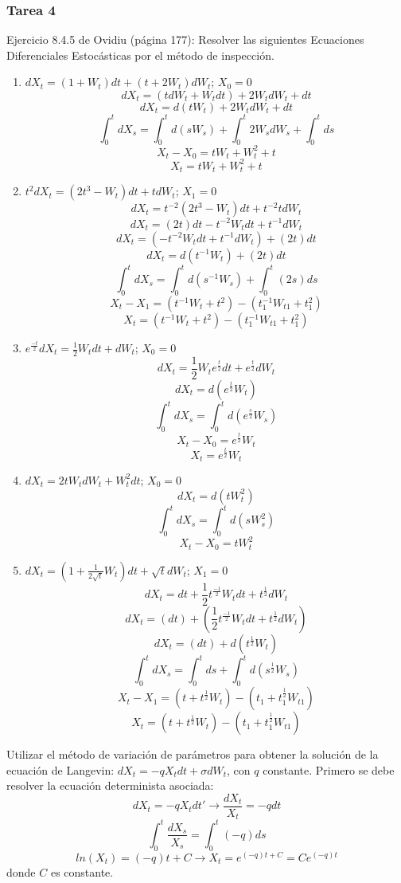 \documentclass[11pt,fleqn]{book} %
\numberwithin{equation}{section} %
\numberwithin{figure}{section} %
\numberwithin{table}{section} %
\begin{document}
\subsubsection{Tarea 4}
Ejercicio 8.4.5 de Ovidiu (página 177): Resolver las siguientes Ecuaciones Diferenciales Estocásticas por el método de inspección.
\begin{enumerate}
    \item $ dX_{t} = (1+W_{t})dt + (t + 2W_{t})dW_{t} $; $X_{0} = 0 $
$$ dX_{t} = (tdW_{t} + W_{t}dt) + 2 W_{t} dW_{t} + dt$$
$$ dX_{t} = d(tW_{t}) + 2 W_{t} dW_{t} + dt $$
$$ \int_{0}^{t} dX_{s} = \int_{0}^{t}d(sW_{s}) + \int_{0}^{t}2 W_{s} dW_{s} + \int_{0}^{t} ds $$
$$ X_{t} - X_{0} = tW_{t} + W_{t}^2 + t $$
$$ X_{t} = tW_{t} + W_{t}^2 + t $$

    \item $ t^{2} dX_{t} = (2t^{3} - W_{t})dt + t dW_{t} $; $X_{1} = 0 $
$$ dX_{t} = t^{-2} (2t^{3} - W_{t})dt + t^{-2} t dW_{t}   $$   
$$ dX_{t} = (2t)dt - t^{-2}W_{t} dt + t^{-1}dW_{t}   $$
$$ dX_{t} =  (-t^{-2}W_{t} dt + t^{-1}dW_{t} ) + (2t)dt  $$
$$ dX_{t} =  d(t^{-1}W_{t} ) + (2t)dt  $$
$$ \int_{0}^{t}dX_{s} =  \int_{0}^{t}d(s^{-1}W_{s} ) + \int_{0}^{t}(2s)ds  $$
$$ X_{t} - X_{1} =  (t^{-1}W_{t} + t^{2}) - (t_{1}^{-1}W_{t1} + t_{1}^{2}) $$
$$ X_{t} =  (t^{-1}W_{t} + t^{2}) - (t_{1}^{-1}W_{t1} + t_{1}^{2}) $$


    \item $ e^{\frac{-t}{2}} dX_{t} = \frac{1}{2} W_{t}dt + dW_{t} $; $X_{0} = 0 $
$$ dX_{t} = \frac{1}{2} W_{t}e^{\frac{t}{2}} dt + e^{\frac{t}{2}}dW_{t} $$
$$ dX_{t} = d(e^{\frac{t}{2}} W_{t}) $$
$$ \int_{0}^{t} dX_{s} = \int_{0}^{t} d(e^{\frac{s}{2}} W_{s}) $$
$$ X_{t} - X_{0} = e^{\frac{t}{2}} W_{t} $$
$$ X_{t} = e^{\frac{t}{2}} W_{t} $$

    \item $ dX_{t} = 2tW_{t}dW_{t} + W_{t}^2 dt $; $X_{0} = 0 $
$$ dX_{t} = d(t W_{t}^{2})  $$
$$ \int_{0}^{t} dX_{s} = \int_{0}^{t} d(s W_{s}^{2})  $$
$$ X_{t} - X_{0} = t W_{t}^{2} $$

    \item $ dX_{t} = (1 + \frac{1}{2 \sqrt{t}} W_{t} ) dt + \sqrt{t} dW_{t} $; $X_{1} = 0 $
$$ dX_{t} = dt + \frac{1}{2}t^{\frac{-1}{2}} W_{t} dt + t^{\frac{1}{2}} dW_{t}  $$
$$ dX_{t} = (dt) + (\frac{1}{2}t^{\frac{-1}{2}} W_{t} dt + t^{\frac{1}{2}} dW_{t})  $$
$$ dX_{t} = (dt) + d(t^{\frac{1}{2}} W_{t})  $$
$$ \int_{0}^{t} dX_{s} = \int_{0}^{t} ds + \int_{0}^{t} d(s^{\frac{1}{2}} W_{s}) $$
$$ X_{t}-X_{1} = (t + t^{\frac{1}{2}} W_{t})-(t_{1} + t_{1}^{\frac{1}{2}} W_{t1}) $$
$$ X_{t} = (t + t^{\frac{1}{2}} W_{t}) - (t_{1} + t_{1}^{\frac{1}{2}} W_{t1}) $$

\end{enumerate}
Utilizar el método de variación de parámetros para obtener la solución de la ecuación de Langevin:
$dX_{t} = -qX_{t}dt + \sigma dW_{t}$, con $q$ constante. Primero se debe resolver la ecuación determinista asociada:
$$ dX_{t} = -q X_{t} dt  '\rightarrow \frac{dX_{t}}{X_{t}} = -q dt$$
$$ \int_{0}^{t} \frac{dX_{s}}{X_{s}} = \int_{0}^{t} (-q) ds$$
$$ ln (X_{t}) = (-q)t + C  \rightarrow X_{t} = e^{(-q)t + C} = Ce^{(-q)t}$$
donde $ C $ es constante.
\end{document}
